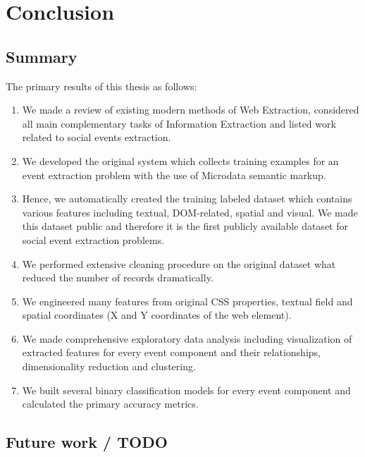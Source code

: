 \chapter{Conclusion}
\label{chap:conclusion}

\section{Summary}

The primary results of this thesis as follows: 
\begin{enumerate}
    \item We made a review of existing modern methods of Web Extraction, considered all main complementary tasks of Information Extraction and listed work related to social events extraction.   
    \item We developed the original system which collects training examples for an event extraction problem with the use of Microdata semantic markup.
    \item Hence, we automatically created the training labeled dataset which contains various features including textual, DOM-related, spatial and visual. We made this dataset public and therefore it is the first publicly available dataset for social event extraction problems.
    \item We performed extensive cleaning procedure on the original dataset what reduced the number of records dramatically.
    \item We engineered many features from original CSS properties, textual field and spatial coordinates  (X and Y coordinates of the web element). 
    \item We made comprehensive exploratory data analysis including visualization of extracted features for every event component and their relationships, dimensionality reduction and clustering.
    \item We built several binary classification models for every event component and calculated the primary accuracy metrics.
\end{enumerate}


\section{Future work  / TODO}